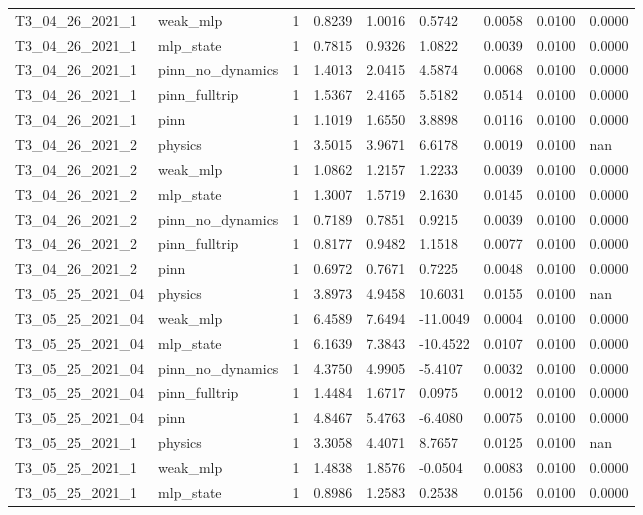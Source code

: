 \begin{table}[t]
\begin{tabular}{lllllllll}
T3\_04\_26\_2021\_1 & weak\_mlp & 1 & 0.8239 & 1.0016 & 0.5742 & 0.0058 & 0.0100 & 0.0000 \\
T3\_04\_26\_2021\_1 & mlp\_state & 1 & 0.7815 & 0.9326 & 1.0822 & 0.0039 & 0.0100 & 0.0000 \\
T3\_04\_26\_2021\_1 & pinn\_no\_dynamics & 1 & 1.4013 & 2.0415 & 4.5874 & 0.0068 & 0.0100 & 0.0000 \\
T3\_04\_26\_2021\_1 & pinn\_fulltrip & 1 & 1.5367 & 2.4165 & 5.5182 & 0.0514 & 0.0100 & 0.0000 \\
T3\_04\_26\_2021\_1 & pinn & 1 & 1.1019 & 1.6550 & 3.8898 & 0.0116 & 0.0100 & 0.0000 \\
T3\_04\_26\_2021\_2 & physics & 1 & 3.5015 & 3.9671 & 6.6178 & 0.0019 & 0.0100 & nan \\
T3\_04\_26\_2021\_2 & weak\_mlp & 1 & 1.0862 & 1.2157 & 1.2233 & 0.0039 & 0.0100 & 0.0000 \\
T3\_04\_26\_2021\_2 & mlp\_state & 1 & 1.3007 & 1.5719 & 2.1630 & 0.0145 & 0.0100 & 0.0000 \\
T3\_04\_26\_2021\_2 & pinn\_no\_dynamics & 1 & 0.7189 & 0.7851 & 0.9215 & 0.0039 & 0.0100 & 0.0000 \\
T3\_04\_26\_2021\_2 & pinn\_fulltrip & 1 & 0.8177 & 0.9482 & 1.1518 & 0.0077 & 0.0100 & 0.0000 \\
T3\_04\_26\_2021\_2 & pinn & 1 & 0.6972 & 0.7671 & 0.7225 & 0.0048 & 0.0100 & 0.0000 \\
T3\_05\_25\_2021\_04 & physics & 1 & 3.8973 & 4.9458 & 10.6031 & 0.0155 & 0.0100 & nan \\
T3\_05\_25\_2021\_04 & weak\_mlp & 1 & 6.4589 & 7.6494 & -11.0049 & 0.0004 & 0.0100 & 0.0000 \\
T3\_05\_25\_2021\_04 & mlp\_state & 1 & 6.1639 & 7.3843 & -10.4522 & 0.0107 & 0.0100 & 0.0000 \\
T3\_05\_25\_2021\_04 & pinn\_no\_dynamics & 1 & 4.3750 & 4.9905 & -5.4107 & 0.0032 & 0.0100 & 0.0000 \\
T3\_05\_25\_2021\_04 & pinn\_fulltrip & 1 & 1.4484 & 1.6717 & 0.0975 & 0.0012 & 0.0100 & 0.0000 \\
T3\_05\_25\_2021\_04 & pinn & 1 & 4.8467 & 5.4763 & -6.4080 & 0.0075 & 0.0100 & 0.0000 \\
T3\_05\_25\_2021\_1 & physics & 1 & 3.3058 & 4.4071 & 8.7657 & 0.0125 & 0.0100 & nan \\
T3\_05\_25\_2021\_1 & weak\_mlp & 1 & 1.4838 & 1.8576 & -0.0504 & 0.0083 & 0.0100 & 0.0000 \\
T3\_05\_25\_2021\_1 & mlp\_state & 1 & 0.8986 & 1.2583 & 0.2538 & 0.0156 & 0.0100 & 0.0000 \\

\end{tabular}
\end{table}
